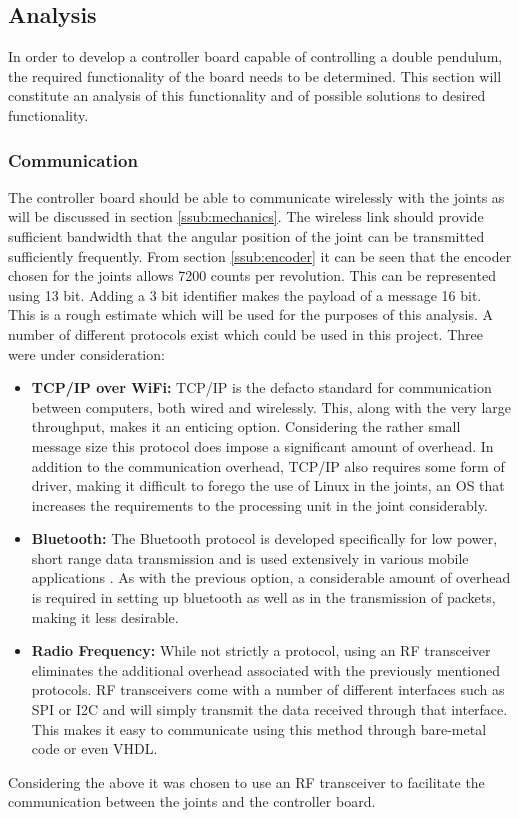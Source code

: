 \subsection{Analysis}
\label{sub:controller_board_analysis}

In order to develop a controller board capable of controlling a double pendulum, the required functionality of the board needs to be determined. 
This section will constitute an analysis of this functionality and of possible solutions to desired functionality.

\subsubsection{Communication} %
\label{ssub:communication}
The controller board should be able to communicate wirelessly with the joints as will be discussed in section \ref{ssub:mechanics}.
The wireless link should provide sufficient bandwidth that the angular position of the joint can be transmitted sufficiently frequently.
From section \ref{ssub:encoder} it can be seen that the encoder chosen for the joints allows 7200 counts per revolution.
This can be represented using 13 bit. 
Adding a 3 bit identifier makes the payload of a message 16 bit.
This is a rough estimate which will be used for the purposes of this analysis.
A number of different protocols exist which could be used in this project.
Three were under consideration:
\begin{itemize}
	\item \textbf{TCP/IP over WiFi:} TCP/IP is the defacto standard for communication between computers, both wired and wirelessly.
	This, along with the very large throughput, makes it an enticing option.
	Considering the rather small message size this protocol does impose a significant amount of overhead.
	In addition to the communication overhead, TCP/IP also requires some form of driver, making it difficult to forego the use of Linux in the joints, an OS that increases the requirements to the processing unit in the joint considerably.
	\item \textbf{Bluetooth:} The Bluetooth protocol is developed specifically for low power, short range data transmission and is used extensively in various mobile applications \cite{bluetooth}.
	As with the previous option, a considerable amount of overhead is required in setting up bluetooth as well as in the transmission of packets, making it less desirable.
	\item \textbf{Radio Frequency:} While not strictly a protocol, using an RF transceiver eliminates the additional overhead associated with the previously mentioned protocols.
	RF transceivers come with a number of different interfaces such as SPI or I2C and will simply transmit the data received through that interface.
	This makes it easy to communicate using this method through bare-metal code or even VHDL.
\end{itemize}
Considering the above it was chosen to use an RF transceiver to facilitate the communication between the joints and the controller board.


